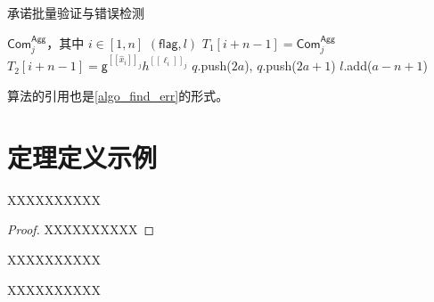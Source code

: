 \begin{algorithm}[!htbp]
    \caption{承诺批量验证与错误检测}
    \label{algo_find_err}
    \begin{algorithmic}[1] %
        \Require $\mathsf{Com}^{\mathsf{Agg}}_{j}$，其中 $i \in [1,n]$
        \Ensure  $(\mathsf{flag}, l)$
            \State $T_1[i + n - 1] = \mathsf{Com}^{\mathsf{Agg}}_{j}$
            \State $T_2[i + n - 1] = \mathsf{g}^{[\![ \hat{x}_{i} ]\!]_{j}}h^{[\![ \ell_{i} ]\!]_{j}}$
        \EndFor
                \State $q$.push($2a$), $q$.push($2a + 1$)
            \Else
                \State $l$.add($a - n + 1$)
            \EndIf
        \EndWhile
        \EndFunction
    \end{algorithmic}
\end{algorithm}

算法的引用也是\cref{algo_find_err}的形式。

\section{定理定义示例}

\begin{theorem}
    XXXXXXXXXX
\end{theorem}
\begin{proof}
    XXXXXXXXXX
\end{proof}
\begin{corollary}
    XXXXXXXXXX
\end{corollary}
\begin{lemma}
    XXXXXXXXXX
\end{lemma}

